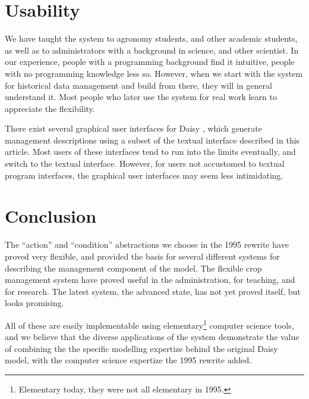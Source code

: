 \documentclass[a4paper]{article}
\begin{document}
\section{Usability}

We have taught the system to agronomy students, and other academic
students, as well as to administrators with a background in science,
and other scientist.  In our experience, people with a programming
background find it intuitive, people with no programming knowledge
less so.  However, when we start with the system for historical data
management and build from there, they will in general understand it.
Most people who later use the system for real work learn to appreciate
the flexibility.

There exist several graphical user interfaces for Daisy
\cite{plantinfo-daisy,daisygis,fertorganic}, which generate management
descriptions using a subset of the textual interface described in this
article.  Most users of these interfaces tend to run into the limits
eventually, and switch to the textual interface.  However, for users
not accustomed to textual program interfaces, the graphical user
interfaces may seem less intimidating.

\section{Conclusion}

The ``action'' and ``condition'' abstractions we choose in the 1995
rewrite have proved very flexible, and provided the basis for several
different systems for describing the management component of the
model.  The flexible crop management system have proved useful in the
administration, for teaching, and for research.  The latest system, the
advanced state, has not yet proved itself, but looks promising.  

All of these are easily implementable using
elementary\footnote{Elementary today, they were not all elementary in
  1995.}  computer science tools, and we believe that the diverse
applications of the system demonstrate the value of combining the the
specific modelling expertize behind the original Daisy model, with the
computer science expertize the 1995 rewrite added.


\end{document}
